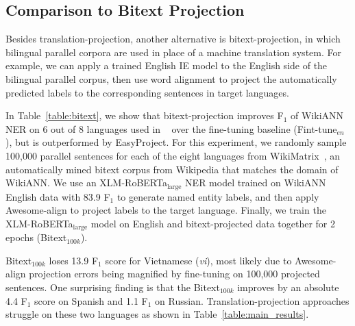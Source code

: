 \documentclass[11pt,dvipsnames]{article}
\begin{document}
\subsection{Comparison to Bitext Projection}
\label{sec:bitext}



Besides translation-projection, another alternative is bitext-projection, in which bilingual parallel corpora are used in place of a machine translation system. For example, we can apply a trained English IE model to the English side of the bilingual parallel corpus, then use word alignment to project the automatically predicted labels to the corresponding sentences in  target languages.



In Table~\ref{table:bitext}, we show that bitext-projection improves F$_1$ of WikiANN NER on 6 out of 8  languages used in ~\cite{wu-2021-everything} over the fine-tuning baseline (Fint-tune$_{\textit{en}}$), but is outperformed by EasyProject. For this experiment, we randomly sample 100,000 parallel sentences for each of the eight languages  from WikiMatrix~\citep{schwenk2019wikimatrix}, an automatically mined bitext corpus from Wikipedia that matches the domain of WikiANN. We use an XLM-RoBERTa$_{\text{large}}$ NER model trained on WikiANN English data  with 83.9 F$_1$ to generate named entity labels, and then apply Awesome-align to project labels to the target language. Finally, we train the XLM-RoBERTa$_{\text{large}}$ model on English and bitext-projected data together for 2 epochs (Bitext$_{100k}$).








Bitext$_{100k}$ loses 13.9 F$_1$ score for Vietnamese (\textit{vi}), most likely due to Awesome-align projection errors being magnified by fine-tuning on 100,000 projected sentences.
One surprising finding is that the Bitext$_{100k}$ improves by an absolute 4.4 F$_1$ score on Spanish and 1.1 F$_1$ on Russian.  Translation-projection approaches struggle on these two languages as shown in Table~\ref{table:main_results}.
\end{document}
